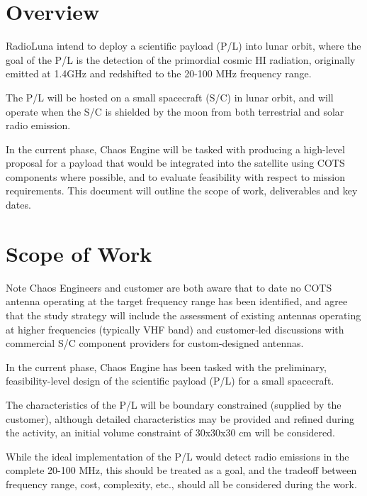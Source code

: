 \documentclass[
	a4paper, %
]{ChaosEngineReport}
\begin{document}
\newpage
\section{Overview} %

RadioLuna intend to deploy a scientific payload (P/L) into lunar orbit, where the goal of the P/L is the detection of the primordial cosmic HI radiation, originally emitted at 1.4GHz and redshifted to the 20-100 MHz frequency range.

The P/L will be hosted on a small spacecraft (S/C) in lunar orbit, and will operate when the S/C is shielded by the moon from both terrestrial and solar radio emission.

In the current phase, Chaos Engine will be tasked with producing a high-level proposal for a payload that would be integrated into the satellite using COTS components where possible, and to evaluate feasibility with respect to mission requirements.
This document will outline the scope of work, deliverables and key dates.

\section {Scope of Work}
\begin{callout_box}{Note}
Chaos Engineers and customer are both aware that to date no COTS antenna operating at the target frequency range has been identified, and agree that the study strategy will include the assessment of existing antennas operating at higher frequencies (typically VHF band) and customer-led discussions with commercial S/C component providers for custom-designed antennas.
\end{callout_box}

In the current phase, Chaos Engine has been tasked with the preliminary, feasibility-level design of the scientific payload (P/L) for a small spacecraft.

The characteristics of the P/L will be boundary constrained (supplied by the customer), although detailed characteristics may be provided and refined during the activity, an initial volume constraint of 30x30x30 cm will be considered.

While the ideal implementation of the P/L would detect radio emissions in the complete 20-100 MHz, this should be treated as a goal, and the tradeoff between frequency range, cost, complexity, etc., should all be considered during the work.
\end{document}
